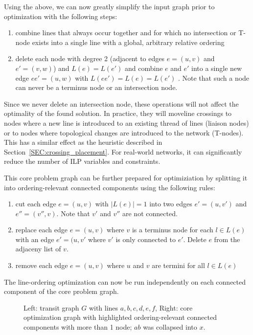 \documentclass{llncs}
\begin{document}
Using the above, we can now greatly simplify the input graph prior to optimization with the following steps:
\begin{enumerate}
\item combine lines that always occur together and for which no intersection or T-node exists into a single line with a global, arbitrary relative ordering
\item delete each node with degree 2 (adjacent to edges $e = (u, v)$ and $e' = (v, w)$) and $L(e) = L(e')$ and combine $e$ and $e'$ into a single new edge $ee' = (u, w)$ with $L(ee') = L(e) = L(e')$ . Note that such a node can never be a terminus node or an intersection node.
\end{enumerate}
Since we never delete an intersection node, these operations will not affect the optimality of the found solution. In practice, they will moveline crossings to nodes where a new line is introduced to an existing thread of lines (liaison nodes) or to nodes where topological changes are introduced to the network (T-nodes). This has a similar effect as the heuristic described in Section~\ref{SEC:crossing_placement}. For real-world networks, it can significantly reduce the number of ILP variables and constraints.

This core problem graph can be further prepared for optimiziation by splitting it into ordering-relevant connected components using the following rules:
\begin{enumerate}
	\item cut each edge $e = (u, v)$ with $|L(e)| = 1$ into two edges $e' = (u, v')$ and $e'' = (v'', v)$. Note that $v'$ and $v''$ are not connected.
	\item replace each edge $e = (u, v)$ where $v$ is a terminus node for each $l \in L(e)$ with an edge $e' = (u, v'$ where $v'$ is only connected to $e'$. Delete $e$ from the adjaceny list of $v$.
	\item remove each edge $e = (u, v)$ where $u$ and $v$ are termini for all $l \in L(e)$
\end{enumerate}
The line-ordering optimization can now be run independently on each connected component of the core problem graph.
\begin{figure}[h]
\centering
	
	\hspace{0.6cm}
	
	\caption{Left: transit graph $G$ with lines $a, b, c, d, e, f$, Right: core optimization graph with highlighted ordering-relevant connected components with more than 1 node; $ab$ was collapsed into $x$.}
\end{figure}
\end{document}
